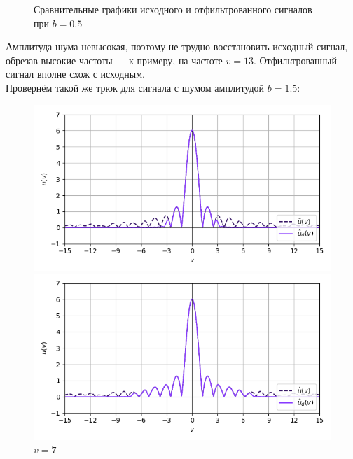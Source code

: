 \documentclass[a4paper]{article}
\begin{document}
\begin{figure}[H]
\begin{minipage}{0.33\textwidth}
        \caption{$v = 13$}
    \end{minipage}
    \caption*{Сравнительные графики исходного и отфильтрованного сигналов при $b=0.5$}
\end{figure}
Амплитуда шума невысокая, поэтому не трудно восстановить исходный сигнал, обрезав высокие частоты --- к примеру, на частоте $v = 13$. Отфильтрованный сигнал вполне схож с исходным.\\[0.5em]
Провернём такой же трюк для сигнала с шумом амплитудой $b = 1.5$:
\begin{figure}[H]
    \begin{minipage}{0.33\textwidth}
        \centering \includegraphics[width=\textwidth]{sources/low-pass filter/fourier (b=1.5, v=3).png}
        \caption{$v = 3$}
    \end{minipage}\hfill
    \begin{minipage}{0.33\textwidth}
        \centering \includegraphics[width=\textwidth]{sources/low-pass filter/fourier (b=1.5, v=7).png}
        \caption{$v = 7$}
    \end{minipage}\hfill
    \begin{minipage}{0.33\textwidth}

\end{minipage}
\end{figure}
\end{document}
